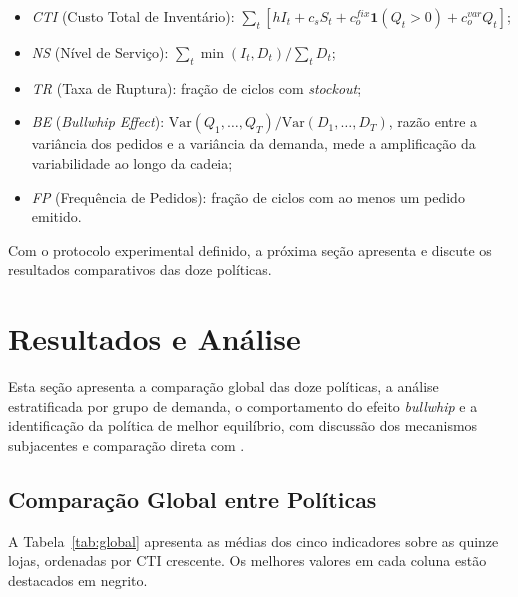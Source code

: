\documentclass[a4paper,11pt]{article}
\begin{document}
\begin{itemize}
  \item \emph{CTI} (Custo Total de Inventário):
    $\sum_{t}[h I_t + c_s S_t + c_o^{fix}\mathbf{1}(Q_t>0) + c_o^{var}Q_t]$;
  \item \emph{NS} (Nível de Serviço):
    $\sum_t \min(I_t, D_t) / \sum_t D_t$;
  \item \emph{TR} (Taxa de Ruptura): fração de ciclos com \textit{stockout};
  \item \emph{BE} (\textit{Bullwhip Effect}):
    $\mathrm{Var}(Q_1,\ldots,Q_T)/\mathrm{Var}(D_1,\ldots,D_T)$,
    razão entre a variância dos pedidos e a variância da demanda,
    mede a amplificação da variabilidade ao longo da cadeia;
  \item \emph{FP} (Frequência de Pedidos): fração de ciclos com
    ao menos um pedido emitido.
\end{itemize}

Com o protocolo experimental definido, a próxima seção apresenta
e discute os resultados comparativos das doze políticas.

\section{Resultados e Análise}

Esta seção apresenta a comparação global das doze políticas, a
análise estratificada por grupo de demanda, o comportamento do efeito
\textit{bullwhip} e a identificação da política de melhor equilíbrio,
com discussão dos mecanismos subjacentes e comparação direta com
\citet{zabraoui:2025}.

\subsection{Comparação Global entre Políticas}

A Tabela~\ref{tab:global} apresenta as médias dos cinco indicadores
sobre as quinze lojas, ordenadas por CTI crescente. Os melhores
valores em cada coluna estão destacados em negrito.
\end{document}
